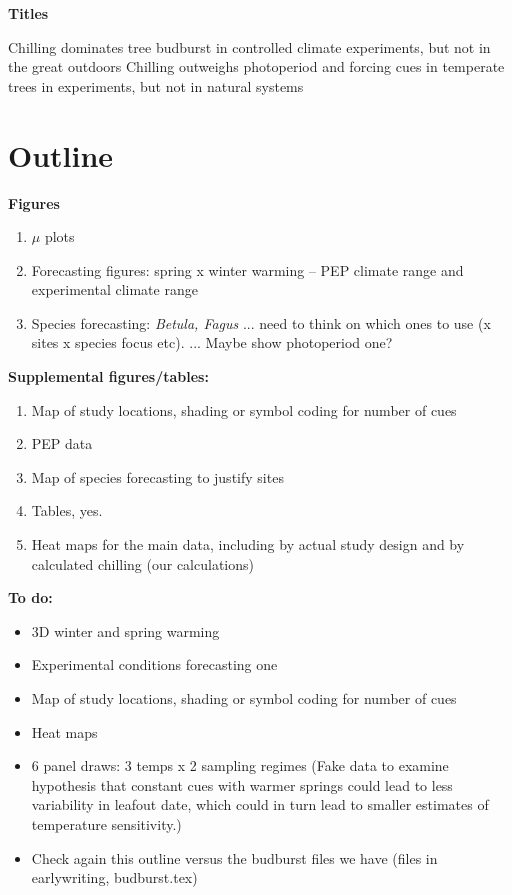 \documentclass[11pt,letter]{article}
\begin{document}

\renewcommand{\refname}{\CHead{}}


{\bf Titles}

Chilling dominates tree budburst in controlled climate experiments, but not in the great outdoors
Chilling outweighs photoperiod and forcing cues in temperate trees in experiments, but not in natural systems

\section{Outline}

{\bf Figures}

\begin{enumerate}
\item $\mu$ plots
\item Forecasting figures: spring x winter warming -- PEP climate range and experimental climate range
\item Species forecasting: \emph{Betula, Fagus} ... need to think on which ones to use (x sites x species focus etc). ... Maybe show photoperiod one?
\end{enumerate}


{\bf Supplemental figures/tables:}
\begin{enumerate}
\item Map of study locations, shading or symbol coding for number of cues
\item PEP data 
\item Map of species forecasting to justify sites
\item Tables, yes.
\item Heat maps for the main data, including by actual study design and by calculated chilling (our calculations)
\end{enumerate}

{\bf To do:}
\begin{itemize}
\item 3D winter and spring warming
\item Experimental conditions forecasting one
\item Map of study locations, shading or symbol coding for number of cues
\item Heat maps
\item 6 panel draws: 3 temps x 2 sampling regimes (Fake data to examine hypothesis that constant cues with warmer springs could lead to less variability in leafout date, which could in turn lead to smaller estimates of temperature sensitivity.) 
\item Check again this outline versus the budburst files we have (files in earlywriting, budburst.tex)
\end{itemize}
\end{document}
